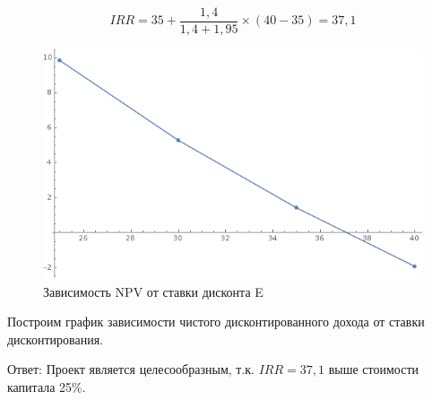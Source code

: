 $$ IRR = 35 + \dfrac{1,4}{1,4+1,95}\times(40- 35) = 37,1$$
\begin{figure}[!h]
	\centering
	\includegraphics[width=1\linewidth]{npvegr}
	\caption{Зависимость NPV от ставки дисконта E}
	\label{fig:npvegr}
\end{figure}

Построим график зависимости чистого дисконтированного дохода от ставки дисконтирования.


Ответ: Проект является целесообразным, т.к. $IRR = 37,1$ выше стоимости капитала 25\%.
